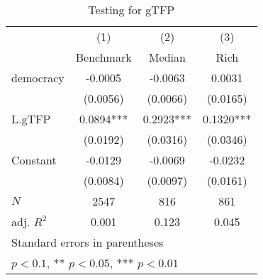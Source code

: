 \begin{table}[htbp]\centering
\def\sym#1{\ifmmode^{#1}\else\(^{#1}\)\fi}
\caption{Testing for gTFP \label{tab:regression3}}
\begin{tabular}{l*{3}{c}}
\hline\hline
            &\multicolumn{1}{c}{(1)}&\multicolumn{1}{c}{(2)}&\multicolumn{1}{c}{(3)}\\
            &\multicolumn{1}{c}{Benchmark}&\multicolumn{1}{c}{Median}&\multicolumn{1}{c}{Rich}\\
\hline
democracy   &     -0.0005   &     -0.0063   &      0.0031   \\
            &    (0.0056)   &    (0.0066)   &    (0.0165)   \\
[1em]
L.gTFP      &      0.0894***&      0.2923***&      0.1320***\\
            &    (0.0192)   &    (0.0316)   &    (0.0346)   \\
[1em]
Constant    &     -0.0129   &     -0.0069   &     -0.0232   \\
            &    (0.0084)   &    (0.0097)   &    (0.0161)   \\
\hline
\(N\)       &        2547   &         816   &         861   \\
adj. \(R^{2}\)&       0.001   &       0.123   &       0.045   \\
\hline\hline
\multicolumn{4}{l}{\footnotesize Standard errors in parentheses}\\
\multicolumn{4}{l}{\footnotesize * \(p<0.1\), ** \(p<0.05\), *** \(p<0.01\)}\\
\end{tabular}
\end{table}

